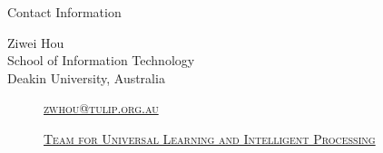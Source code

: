 \documentclass[
 size=12pt,
 paper=smartboard, %
 mode=present, %
 display=slides, %
style=tuliplab,
pauseslide,
fleqn,leqno]{powerdot}
\begin{document}
\begin{wideslide}[toc=,bm=]{Contact Information}
	\centering
	\twocolumn[
	lcolwidth=0.35\linewidth,
	rcolwidth=0.65\linewidth
	]
	{
	}
	{
		Ziwei Hou\\
		School of Information Technology\\
		Deakin University, Australia
		
		\begin{description}
			\item[\textcolor{orange}{\faEnvelope}] \href{mailto:xin.han@tulip.org.au}
			{\textsc{\footnotesize{zwhou@tulip.org.au}}}
			
			\item[\textcolor{orange}{\faHome}] \href{http://www.tulip.org.au}
			{\textsc{\footnotesize{Team for Universal Learning and Intelligent Processing}}}
		\end{description}
	}
\end{wideslide}
\end{document}
